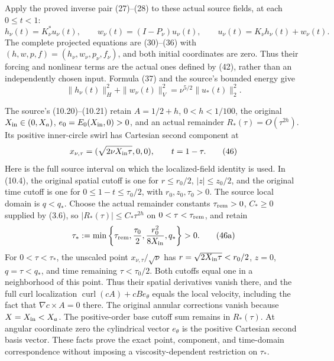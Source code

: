 Apply the proved inverse pair (27)--(28) to these actual source fields, at each \(0\le t<1\): \[
h_\nu(t)=K_\nu^*u_\nu(t),\qquad
w_\nu(t)=(I-P_\nu)u_\nu(t),\qquad
u_\nu(t)=K_\nu h_\nu(t)+w_\nu(t).
\tag{44}
\] The complete projected equations are (30)--(36) with \((h,w,p,f)=(h_\nu,w_\nu,p_\nu,f_\nu)\), and both initial coordinates are zero. Thus their forcing and nonlinear terms are the actual ones defined by (42), rather than an independently chosen input. Formula (37) and the source's bounded energy give \[
\|h_\nu(t)\|_H^2+\|w_\nu(t)\|_V^2
=\nu^{5/2}\|u_*(t)\|_2^2.
\tag{45}
\]

The source's (10.20)--(10.21) retain \(A=1/2+h\), \(0<h<1/100\), the original \(X_{\rm in}\in(0,X_a)\), \(e_0=E_0(X_{\rm in},0)>0\), and an actual remainder \(R_*(\tau)=O(\tau^{2h})\). Its positive inner-circle swirl has Cartesian second component at \[
x_{\nu,\tau}=(\sqrt{2\nu X_{\rm in}\tau},0,0),\qquad t=1-\tau.
\tag{46}
\] Here is the full source interval on which the localized-field identity is used. In (10.4), the original spatial cutoff is one for \(r\le r_0/2\), \(|z|\le z_0/2\), and the original time cutoff is one for \(0\le1-t\le\tau_0/2\), with \(r_0,z_0,\tau_0>0\). The source local domain is \(q<q_*\). Choose the actual remainder constants \(\tau_{\rm rem}>0\), \(C_*\ge0\) supplied by (3.6), so \(|R_*(\tau)|\le C_*\tau^{2h}\) on \(0<\tau<\tau_{\rm rem}\), and retain \[
\tau_*:=\min\left\{\tau_{\rm rem},\frac{\tau_0}{2},
\frac{r_0^2}{8X_{\rm in}},q_*\right\}>0.
\tag{46a}
\] For \(0<\tau<\tau_*\), the unscaled point \(x_{\nu,\tau}/\sqrt\nu\) has \(r=\sqrt{2X_{\rm in}\tau}<r_0/2\), \(z=0\), \(q=\tau<q_*\), and time remaining \(\tau<\tau_0/2\). Both cutoffs equal one in a neighborhood of this point. Thus their spatial derivatives vanish there, and the full curl localization \(\operatorname{curl}(cA)+cB e_\theta\) equals the local velocity, including the fact that \(\nabla c\times A=0\) there. The original annular corrections vanish because \(X=X_{\rm in}<X_a\). The positive-order base cutoff sum remains in \(R_*(\tau)\). At angular coordinate zero the cylindrical vector \(e_\theta\) is the positive Cartesian second basis vector. These facts prove the exact point, component, and time-domain correspondence without imposing a viscosity-dependent restriction on \(\tau_*\).

